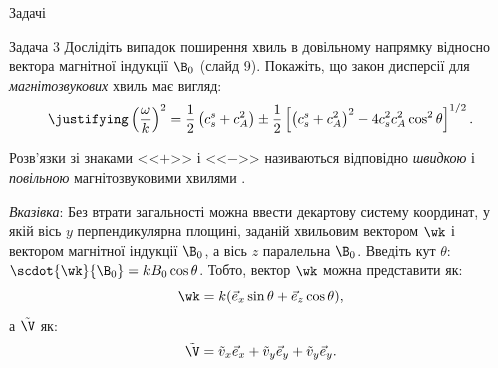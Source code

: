 \documentclass[]{beamer}
\begin{document}
\begin{frame}{Задачі}{}
	\begin{exampleblock}{Задача 3}
		Дослідіть випадок поширення хвиль в довільному напрямку відносно вектора магнітної індукції $\B_0$ (слайд 9). Покажіть, що закон дисперсії для
		\emph{магнітозвукових} хвиль має вигляд:
		\begin{equation*}\justifying
			\left(\frac{\omega}{k}\right)^2 = \frac12\left( c^s_s + c^2_A \right) \pm \frac12\left[ \left( c^s_s + c^2_A \right)^2 -
				4c_s^2c_A^2\cos^2\theta\right]^{1/2}.
		\end{equation*}

		Розв'язки зі знаками <<$+$>> і <<$-$>> називаються відповідно \textit{швидкою} і \textit{повільною} магнітозвуковими хвилями .

		\bigskip

		\textit{Вказівка}: Без втрати загальності можна ввести декартову систему координат, у якій вісь $y$
		перпендикулярна площині, заданій хвильовим вектором $\wk$ і вектором магнітної індукції $\B_0$, а вісь
		$z$ паралельна $\B_0$. Введіть кут $\theta$: $\scdot{\wk}{\B_0} = kB_0\cos\theta$. Тобто, вектор $\wk$ можна представити як:
		\begin{equation*}
			\wk = k(\vec{e}_x\sin\theta + \vec{e}_z\cos\theta),
		\end{equation*}
		а $\tilde{\V}$ як:
		\begin{equation*}
			\tilde{\V} = \tilde{v}_x\vec{e}_x + \tilde{v}_y\vec{e}_y+ \tilde{v}_y\vec{e}_y.
		\end{equation*}

	\end{exampleblock}
\end{frame}
\end{document}
